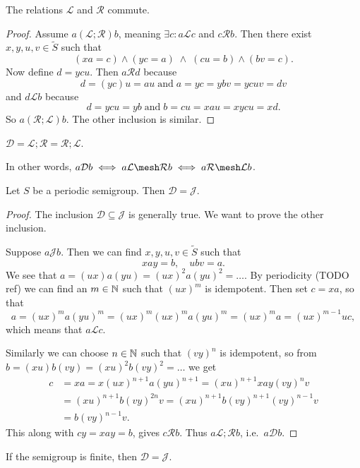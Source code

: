 \begin{proposition}
The relations $\mathcal{L}$ and $\mathcal{R}$ commute.
\end{proposition}
\begin{proof}
Assume $a(\mathcal{L};\mathcal{R})b$, meaning $\exists c: a\mathcal{L}c$ and $c\mathcal{R}b$. Then there exist $x,y,u,v\in \widetilde{S}$ such that
\[ (xa = c) \land (yc = a) \;\land\; (cu = b) \land (bv = c). \]
Now define $d = ycu$. Then $a\mathcal{R}d$ because
\[ d = (yc)u = au \;\text{and}\; a = yc = ybv = ycuv = dv \]
and $d\mathcal{L}b$ because
\[ d = ycu = yb \;\text{and}\; b = cu = xau = xycu = xd. \]
So $a(\mathcal{R};\mathcal{L})b$. The other inclusion is similar.
\end{proof}
\begin{corollary}
$\mathcal{D} = \mathcal{L};\mathcal{R} = \mathcal{R};\mathcal{L}$.
\end{corollary}
In other words, $a\mathcal{D}b \iff a\mathcal{L} \mesh \mathcal{R}b \iff a\mathcal{R} \mesh \mathcal{L}b$.

\begin{proposition}
Let $S$ be a periodic semigroup. Then $\mathcal{D} = \mathcal{J}$.
\end{proposition}
\begin{proof}
The inclusion $\mathcal{D} \subseteq \mathcal{J}$ is generally true. We want to prove the other inclusion.

Suppose $a\mathcal{J}b$. Then we can find $x,y,u,v\in \widetilde{S}$ such that
\[ xay = b, \quad ubv = a. \]
We see that $a = (ux)a(yu) = (ux)^2a(yu)^2 = \ldots$. By periodicity (TODO ref) we can find an $m\in \mathbb{N}$ such that $(ux)^m$ is idempotent. Then set $c= xa$, so that
\[ a = (ux)^ma(yu)^m = (ux)^m(ux)^ma(yu)^m = (ux)^ma = (ux)^{m-1}uc, \]
which means that $a\mathcal{L}c$.

Similarly we can choose $n\in \mathbb{N}$ such that $(vy)^n$ is idempotent, so from $b = (xu)b(vy) = (xu)^2b(vy)^2 = \ldots$
we get
\begin{align*}
c &= xa = x(ux)^{n+1}a(yu)^{n+1} = (xu)^{n+1}xay(vy)^nv \\
&= (xu)^{n+1}b(vy)^{2n}v = (xu)^{n+1}b(vy)^{n+1}(vy)^{n-1}v \\
&= b(vy)^{n-1}v.
\end{align*}
This along with $cy = xay = b$, gives $c\mathcal{R}b$. Thus $a\mathcal{L};\mathcal{R}b$, i.e.\ $a\mathcal{D}b$.
\end{proof}
\begin{corollary}
If the semigroup is finite, then $\mathcal{D} = \mathcal{J}$.
\end{corollary}

